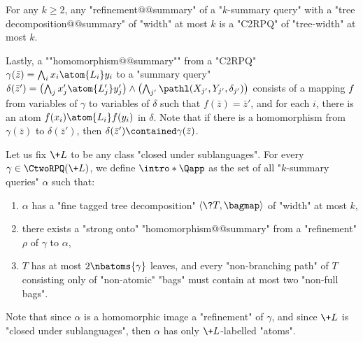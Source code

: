 \begin{fact}
	\AP\label{fact:tree-width-summary}
	For any $k\geq 2$, any "refinement@@summary" of a "$k$-summary query" with
	a "tree decomposition@@summary" of "width" at most $k$ is a "C2RPQ" of "tree-width" at most $k$.
\end{fact}

Lastly, a \AP""homomorphism@@summary"" from a "C2RPQ"
$\gamma(\bar z) = \bigwedge_{i} x_i \atom{L_i} y_i$
to a "summary query" $\delta(\bar z') =
\bigl( \bigwedge_{j} x'_j \atom{L'_j} y'_j \bigr)
\wedge \bigl( \bigwedge_{j'} \pathl(X_{j'}, Y_{j'}, \delta_{j'}) \bigr)$
consists of a mapping $f$ from variables of $\gamma$ to variables of $\delta$
such that $f(\bar z) = \bar z'$, and for each $i$,
there is an atom $f(x_i) \atom{L_i} f(y_i)$ in $\delta$.
Note that if there is a homomorphism from $\gamma(\bar z)$ to $\delta(\bar z')$,
then $\delta(\bar z') \contained \gamma(\bar z)$.

Let us fix $\+L$ to be any class  "closed under sublanguages". For every $\gamma \in \CtwoRPQ(\+L)$, we define \AP $\intro*\Qapp$ as the set of all "$k$-summary queries" $\alpha$ such that:
\begin{enumerate}[label=\roman*.]
	\item $\alpha$ has a "fine tagged tree decomposition" $\tup{\?T, \bagmap}$ of "width" at most $k$,
	\item there exists a "strong onto" "homomorphism@@summary" from a "refinement" $\rho$ of $\gamma$ to $\alpha$, 
	\item $T$ has at most $2\nbatoms{\gamma}$ leaves, and every
		"non-branching path" of $T$ consisting only of "non-atomic" "bags" must contain at most two "non-full bags".
\end{enumerate}
Note that since $\alpha$ is a homomorphic image a "refinement" of $\gamma$,
and since $\+L$ is "closed under sublanguages", then $\alpha$ has only $\+L$-labelled "atoms".

